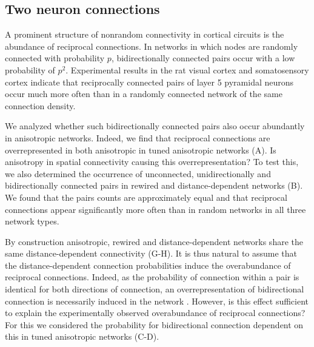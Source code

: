 \subsection*{Two neuron connections}

A prominent structure of nonrandom connectivity in cortical circuits
is the abundance of reciprocal connections. In networks in which nodes
are randomly connected with probability $p$, bidirectionally connected
pairs occur with a low probability of $p^2$. Experimental results in
the rat visual cortex \cite{Song2005} and somatosensory cortex
\cite{Markram1997, Perin2011} indicate that reciprocally connected
pairs of layer 5 pyramidal neurons occur much more often than in a
randomly connected network of the same connection density.

We analyzed whether such bidirectionally connected pairs also occur
abundantly in anisotropic networks. Indeed, we find that reciprocal
connections are overrepresented in both anisotropic in tuned
anisotropic networks (A). Is anisotropy in
spatial connectivity causing this overrepresentation? To test this, we
also determined the occurrence of unconnected, unidirectionally and
bidirectionally connected pairs in rewired and distance-dependent
networks (B). We found that the pairs counts
are approximately equal and that reciprocal connections appear
significantly more often than in random networks in all three network
types.



By construction anisotropic, rewired and distance-dependent networks
share the same distance-dependent connectivity
(G-H). It is thus natural to assume that the
distance-dependent connection probabilities induce the overabundance
of reciprocal connections. Indeed, as the probability of connection
within a pair is identical for both directions of connection, an
overrepresentation of bidirectional connection is necessarily induced
in the network \cite{Hoffmann2017}. However, is this effect sufficient
to explain the experimentally observed overabundance of reciprocal
connections? For this we considered the probability for bidirectional
connection dependent on this in tuned anisotropic networks
(C-D).



